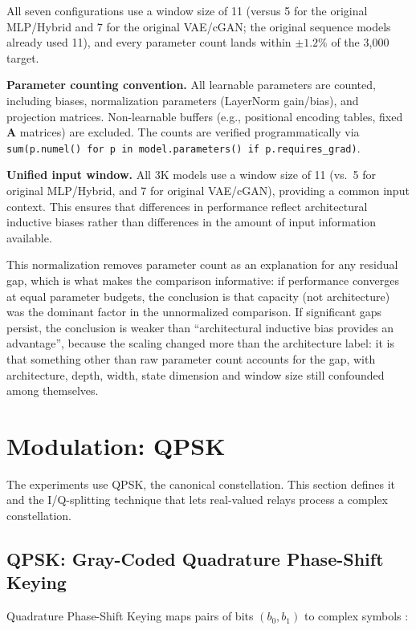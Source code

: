 All seven configurations use a window size of 11 (versus 5 for the original MLP/Hybrid and 7 for the original VAE/cGAN; the original sequence models already used 11), and every parameter count lands within $\pm1.2\%$ of the 3{,}000 target.

\textbf{Parameter counting convention.} All learnable parameters are counted, including biases, normalization parameters (LayerNorm gain/bias), and projection matrices. Non-learnable buffers (e.g., positional encoding tables, fixed \(\mathbf{A}\) matrices) are excluded. The counts are verified programmatically via \texttt{sum(p.numel()\ for\ p\ in\ model.parameters()\ if\ p.requires\_grad)}.

\textbf{Unified input window.} All 3K models use a window size of 11 (vs.~5 for original MLP/Hybrid, and 7 for original VAE/cGAN), providing a common input context. This ensures that differences in performance reflect architectural inductive biases rather than differences in the amount of input information available.

This normalization removes parameter count as an explanation for any residual gap, which is what makes the comparison informative: if performance converges at equal parameter budgets, the conclusion is that capacity (not architecture) was the dominant factor in the unnormalized comparison. If significant gaps persist, the conclusion is weaker than ``architectural inductive bias provides an advantage'', because the scaling changed more than the architecture label: it is that something other than raw parameter count accounts for the gap, with architecture, depth, width, state dimension and window size still confounded among themselves.

\section{Modulation: QPSK}\label{sec:modulation-schemes}

The experiments use QPSK, the canonical constellation. This section defines it and the I/Q-splitting technique that lets real-valued relays process a complex constellation.

\subsection{QPSK: Gray-Coded Quadrature Phase-Shift Keying}\label{sec:qpsk-gray-coded-quadrature-phase-shift-keying}

Quadrature Phase-Shift Keying maps pairs of bits \((b_0, b_1)\) to complex symbols \cite{ProakisSalehi2008DigitalComm}:

